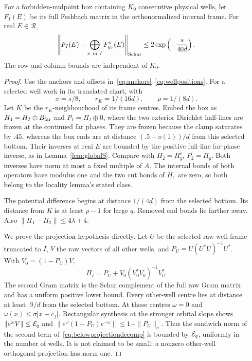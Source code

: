 \begin{proposition}\label{prop:belowboxcompare}
For a forbidden-midpoint box containing $K_0$ consecutive physical wells, let $F_I(E)$ be its full Feshbach matrix in the orthonormalized internal frame. For real $E\in\mathcal R$,
\begin{equation}\label{eq:belowboxcompare}
 \left\|F_I(E)-\bigoplus_{\nu\ {\rm in}\ I}F^c_{y_\nu}(E)\right\|_{\rm Schur}
 \le2\exp\left(-\frac{s}{40d}\right).
\end{equation}
The row and column bounds are independent of $K_0$.
\end{proposition}
\begin{proof}
Use the anchors and offsets in~\eqref{eq:anchors}--\eqref{eq:wellpositions}. For a selected well work in its translated chart, with
\[
 \sigma=s/8,\qquad r_K=1/(16d),\qquad \rho=1/(8d).
\]
Let $K$ be the $r_K$-neighbourhood of its frame centres.
Embed the box as $H_1=H_I\oplus B_{\rm far}$ and $P_1=\Pi_I\oplus0$, where the two exterior Dirichlet half-lines are frozen at the continued far phases. They are frozen because the clamp saturates by $.45$, whereas the box ends are at distance $(.5-o(1))/d$ from this selected bottom. Their inverses at real $E$ are bounded by the positive full-line far-phase inverse, as in Lemma~\ref{lem:globalS}. Compare with $H_2=H_y^c$, $P_2=\Pi_y$. Both inverses have norm at most a fixed multiple of $A$. The internal bonds of both operators have modulus one and the two cut bonds of $H_1$ are zero, so both belong to the locality lemma's stated class.

The potential difference begins at distance $1/(4d)$ from the selected bottom. Its distance from $K$ is at least $\rho-1$ for large $q$. Removed end bonds lie farther away. Also $\|H_1-H_2\|\le4\lambda+4$.

We prove the projection hypothesis directly. Let $U$ be the selected raw well frame truncated to $I$, $V$ the raw vectors of all other wells, and
$P_U=U(U^*U)^{-1}U^*$. With $V_0=(1-P_U)V$,
\begin{equation}\label{eq:belowprojectiondecomp}
 \Pi_I=P_U+V_0(V_0^*V_0)^{-1}V_0^*.
\end{equation}
The second Gram matrix is the Schur complement of the full raw Gram matrix and has a uniform positive lower bound. Every other-well centre lies at distance at least $.9/d$ from the selected bottom. At those centres $\omega=0$ and
$\omega(x)\le\sigma|x-c_f|$. Rectangular synthesis at the stronger orbital slope shows
$\|e^\omega V\|\le\mathcal E_q$ and
$\|e^\omega(1-P_U)e^{-\omega}\|\le1+\|P_U\|_\sigma$.
Thus the sandwich norm of the second term of~\eqref{eq:belowprojectiondecomp} is bounded by $\mathcal E_q$, uniformly in the number of wells. It is not claimed to be small: a nonzero other-well orthogonal projection has norm one.


\end{proof}
